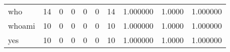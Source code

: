 \begin{longtable}{lrrrrrrrrr}
who       &                                       14 &                                                  0 &                                                  0 &                                                  0 &                                                  0 &                                                 14 &                                           1.000000 &                                 1.0000 &                             1.000000 \\
whoami    &                                       10 &                                                  0 &                                                  0 &                                                  0 &                                                  0 &                                                 10 &                                           1.000000 &                                 1.0000 &                             1.000000 \\
yes       &                                       10 &                                                  0 &                                                  0 &                                                  0 &                                                  0 &                                                 10 &                                           1.000000 &                                 1.0000 &                             1.000000 \\
\end{longtable}
